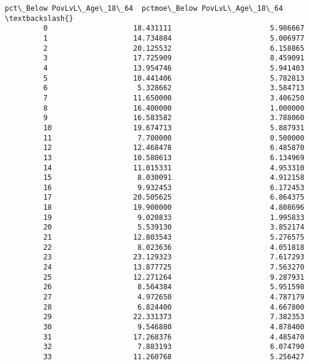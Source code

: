 \documentclass[11pt]{article}
\begin{document}
\begin{Verbatim}[commandchars=\\\{\}]
             pct\_Below PovLvL\_Age\_18\_64  pctmoe\_Below PovLvL\_Age\_18\_64  \textbackslash{}
         0                    18.431111                       5.986667   
         1                    14.734884                       5.006977   
         2                    20.125532                       6.158865   
         3                    17.725909                       8.459091   
         4                    13.954746                       5.941403   
         5                    10.441406                       5.782813   
         6                     5.328662                       3.584713   
         7                    11.650000                       3.406250   
         8                    16.400000                       1.000000   
         9                    16.583582                       3.788060   
         10                   19.674713                       5.887931   
         11                    7.700000                       0.500000   
         12                   12.468478                       6.485870   
         13                   10.580613                       6.134969   
         14                   11.015331                       4.953310   
         15                    8.030091                       4.912158   
         16                    9.932453                       6.172453   
         17                   20.505625                       6.864375   
         18                   19.900000                       4.808696   
         19                    9.020833                       1.995833   
         20                    5.539130                       3.852174   
         21                   12.803543                       5.276575   
         22                    8.023636                       4.051818   
         23                   23.129323                       7.617293   
         24                   13.877725                       7.563270   
         25                   12.271264                       9.287931   
         26                    8.564384                       5.951598   
         27                    4.972650                       4.787179   
         28                    6.824400                       4.667800   
         29                   22.331373                       7.382353   
         30                    9.546880                       4.878400   
         31                   17.268376                       4.485470   
         32                    7.883193                       6.074790   
         33                   11.260768                       5.256427   

\end{Verbatim}
\end{document}
